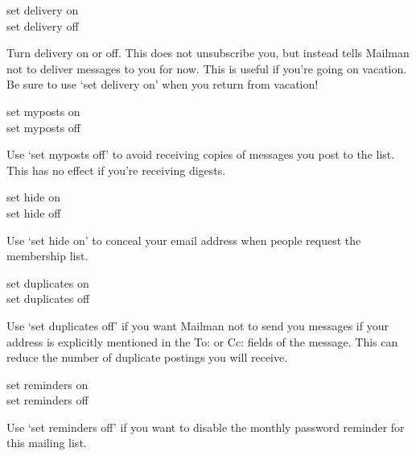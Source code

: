 \documentclass{howto}
\begin{document}
\begin{list}{}{}
   \item set delivery on\\
    set delivery off
		\begin{list}{}{}
			\item
        Turn delivery on or off.  This does not unsubscribe you, but instead
        tells Mailman not to deliver messages to you for now.  This is useful
        if you're going on vacation.  Be sure to use `set delivery on' when
        you return from vacation!
		\end{list}

   \item set myposts on\\
    set myposts off
		\begin{list}{}{}
			\item
        Use `set myposts off' to avoid receiving copies of messages you post to
        the list.  This has no effect if you're receiving digests.
		\end{list}

    \item set hide on\\
    set hide off
		\begin{list}{}{}
			\item
        Use `set hide on' to conceal your email address when people request
        the membership list.
		\end{list}

    \item set duplicates on\\
    set duplicates off
		\begin{list}{}{}
			\item
        Use `set duplicates off' if you want Mailman not to send you messages
        if your address is explicitly mentioned in the To: or Cc: fields of
        the message.  This can reduce the number of duplicate postings you
        will receive.
		\end{list}

    \item set reminders on\\
    set reminders off
		\begin{list}{}{}
        \item Use `set reminders off' if you want to disable the monthly password
        reminder for this mailing list.
		\end{list}
\end{list}
\end{document}
